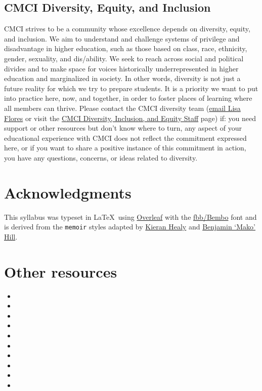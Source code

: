 \documentclass[11pt]{memoir}
\begin{document}
\subsection{CMCI Diversity, Equity, and Inclusion}
CMCI strives to be a community whose excellence depends on diversity, equity, and inclusion. We aim to understand and challenge systems of privilege and disadvantage in higher education, such as those based on class, race, ethnicity, gender, sexuality, and dis/ability. We seek to reach across social and political divides and to make space for voices historically underrepresented in higher education and marginalized in society. In other words, diversity is not just a future reality for which we try to prepare students. It is a priority we want to put into practice here, now, and together, in order to foster places of learning where all members can thrive. Please contact the CMCI diversity team (\href{mailto:lisa.flores@colorado.edu}{email Lisa Flores} or visit the \href{https://www.colorado.edu/cmci/about-college/diversity-equity-and-inclusion/our-team}{CMCI Diversity, Inclusion, and Equity Staff} page) if: you need support or other resources but don't know where to turn, any aspect of your educational experience with CMCI does not reflect the commitment expressed here, or if you want to share a positive instance of this commitment in action, you have any questions, concerns, or ideas related to diversity.

\section{Acknowledgments}
This syllabus was typeset in \LaTeX~using \href{http://www.overleaf.com}{Overleaf} with the \href{http://www.tug.dk/FontCatalogue/fbb/}{fbb/Bembo} font and is derived from the \texttt{memoir} styles adapted by \href{https://github.com/kjhealy/latex-custom-kjh}{Kieran Healy} and \href{http://projects.mako.cc/source/?p=latex_mako;a=summary}{Benjamin `Mako' Hill}.

\section{Other resources}
\begin{itemize}
    \item {}
    \item {}
    \item {}
    \item {}
    \item {}
    \item {}
    \item {}
    \item {}
    \item {}
    \item {}
\end{itemize}
\end{document}
